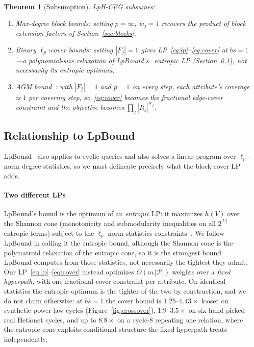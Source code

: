 \documentclass[sigconf, nonacm, acmthm=false]{acmart}
\newcommand{\rel}{R}
\newcommand{\block}{F}
\newtheorem{theorem}{Theorem}
\begin{document}
\begin{theorem}[Subsumption]
\label{thm:subsumption}
LpH-CEG subsumes:
\begin{enumerate}
\item Max-degree block bounds: setting $p = \infty$,
  $w_j = 1$ recovers the product of block extension factors of Section~\ref{sec:blocks}.
\item Binary $\ell_p$-cover bounds: setting $|\block_j| = 1$ gives
  LP~\eqref{eq:lp}--\eqref{eq:cover} at $bs{=}1$---a polynomial-size
  relaxation of LpBound's~\cite{zhang2025lpbound} entropic LP
  (Section~\ref{sec:vs-lpbound}), not necessarily its entropic optimum.
\item AGM bound~\cite{atserias2008agm}: with $|\block_j|{=}1$ and $p{=}1$ on every step,
  each attribute's coverage is $1$ per covering step, so~\eqref{eq:cover}
  becomes the fractional edge-cover constraint and the objective becomes
  $\prod_j |\rel_j|^{w_j}$.
\end{enumerate}
\end{theorem}

\subsection{Relationship to LpBound}
\label{sec:vs-lpbound}

LpBound~\cite{zhang2025lpbound} also applies to cyclic queries and also
solves a linear program over $\ell_p$-norm degree statistics, so we must
delineate precisely what the block-cover LP adds.

\paragraph{Two different LPs}
LpBound's bound is the optimum of an \emph{entropic} LP: it maximizes
$h(V)$ over the Shannon cone (monotonicity and submodularity
inequalities on all $2^{|V|}$ entropic terms) subject to the
$\ell_p$-norm statistics constraints~\cite{zhang2025lpbound,abokhamis2024lpnorm}.
We follow LpBound in calling it the entropic bound, although the Shannon
cone is the polymatroid relaxation of the entropic cone, so it is the
strongest bound LpBound computes from those statistics, not necessarily
the tightest they admit.
Our LP~\eqref{eq:lp}--\eqref{eq:cover} instead optimizes
$O(m\,|\mathcal{P}|)$ weights over a \emph{fixed hyperpath}, with one
fractional-cover constraint per attribute.
On identical statistics the entropic optimum is the tighter of the two by
construction, and we do not claim otherwise: at $bs{=}1$ the cover bound
is $1.25$--$1.43\times$ looser on synthetic power-law cycles
(Figure~\ref{fig:crossover}), $1.9$--$3.5\times$ on six hand-picked
real Hetionet cycles, and up to $8.8\times$ on a cycle-$8$ repeating one relation, where the entropic cone exploits
conditional structure the fixed hyperpath treats independently.
\end{document}
